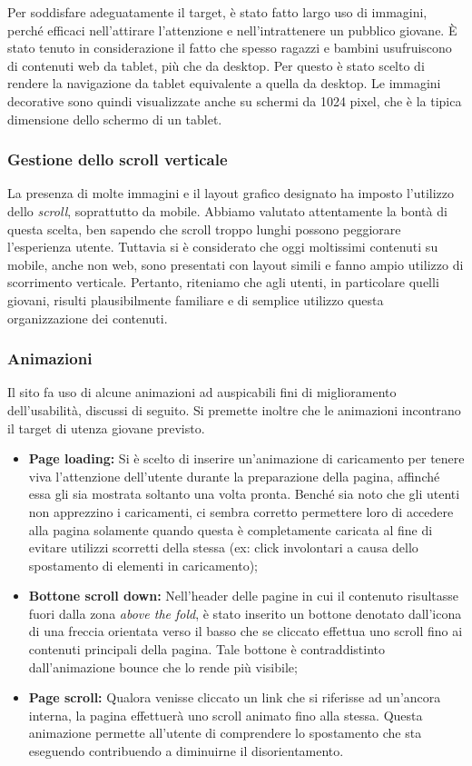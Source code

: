 \documentclass[12pt]{article}
\begin{document}
		Per soddisfare adeguatamente il target, è stato fatto largo uso di immagini, perché efficaci nell'attirare l'attenzione e nell'intrattenere un pubblico giovane. È stato tenuto in considerazione il fatto che spesso ragazzi e bambini usufruiscono di contenuti web da tablet, più che da desktop. Per questo è stato scelto di rendere la navigazione da tablet equivalente a quella da desktop. Le immagini decorative sono quindi visualizzate anche su schermi da 1024 pixel, che è la tipica dimensione dello schermo di un tablet.
	
		\subsubsection{Gestione dello scroll verticale}
		La presenza di molte immagini e il layout grafico designato ha imposto l'utilizzo dello \textit{scroll}, soprattutto da mobile. Abbiamo valutato attentamente la bontà di questa scelta, ben sapendo che scroll troppo lunghi possono peggiorare l'esperienza utente. Tuttavia si è considerato che oggi moltissimi contenuti su mobile, anche non web, sono presentati con layout simili e fanno ampio utilizzo di scorrimento verticale. Pertanto, riteniamo che agli utenti, in particolare quelli giovani, risulti plausibilmente familiare e di semplice utilizzo questa organizzazione dei contenuti.
		
		\subsubsection{Animazioni}
		Il sito fa uso di alcune animazioni ad auspicabili fini di miglioramento dell'usabilità,  discussi di seguito. Si premette inoltre che le animazioni incontrano il target di utenza giovane previsto.
		
		\begin{itemize}
			\item \textbf{Page loading:} Si è scelto di inserire un'animazione di caricamento per tenere viva l'attenzione dell'utente durante la preparazione della pagina, affinché essa gli sia mostrata soltanto una volta pronta. Benché sia noto che gli utenti non apprezzino i caricamenti, ci sembra corretto permettere loro di accedere alla pagina solamente quando questa è completamente caricata al fine di evitare utilizzi scorretti della stessa (ex: click involontari a causa dello spostamento di elementi in caricamento);
			\item \textbf{Bottone scroll down:} Nell'header delle pagine in cui il contenuto risultasse fuori dalla zona \textit{above the fold}, è stato inserito un bottone denotato dall'icona di una freccia orientata verso il basso che se cliccato effettua uno scroll fino ai contenuti principali della pagina. Tale bottone è contraddistinto dall'animazione bounce che lo rende più visibile;
			\item \textbf{Page scroll:} Qualora venisse cliccato un link che si riferisse ad un'ancora interna, la pagina effettuerà uno scroll animato fino alla stessa. Questa animazione permette all'utente di comprendere lo spostamento che sta eseguendo contribuendo a diminuirne il disorientamento. 
		\end{itemize}
		
\end{document}
